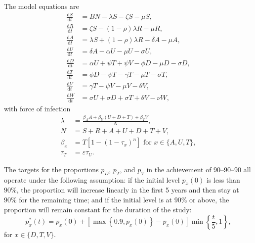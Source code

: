 \documentclass[11pt]{article}
\newcommand{\md}{\mathrm{d}}
\begin{document}
The model equations are
\begin{equation}
  \label{model_eqns}
  \begin{split}
    \frac{\md S}{\md t} &= B N - \lambda S - \zeta S- \mu S,
    \\
    \frac{\md R}{\md t} & = \zeta S - (1 - \rho) \lambda R - \mu R,
    \\
    \frac{\md A}{\md t} &= \lambda S + (1 - \rho) \lambda R - \delta A - \mu A,
    \\
    \frac{\md U}{\md t} &= \delta A - \alpha U - \mu U - \sigma U,
    \\
    \frac{\md D}{\md t} &=  \alpha U + \psi T + \psi V
    - \phi D - \mu D - \sigma D,
    \\
    \frac{\md T}{\md t} &= \phi D - \psi T - \gamma T - \mu T
    - \sigma T,
    \\
    \frac{\md V}{\md t} &= \gamma T - \psi V - \mu V - \theta V,
    \\
    \frac{\md W}{\md t} &= \sigma U + \sigma D + \sigma T + \theta V -
    \nu W,
  \end{split}
\end{equation}
with force of infection
\begin{equation}
  \label{force_of_infection}
  \begin{split}
    \lambda &= \frac{\beta_A A + \beta_U (U + D + T) + \beta_T V}{N},
    \\
    N &= S + R +  A + U + D + T + V,
    \\
    \beta_x &= T \left[1 - (1 - \tau_x)^n\right]
    \text{ for $x \in \{A, U, T\}$},
    \\
    \tau_T &= \varepsilon \tau_U.
  \end{split}
\end{equation}

The targets for the proportions $p_D$, $p_T$, and $p_V$ in the
achievement of 90--90--90 all operate under the following assumption:
if the initial level $p_x(0)$ is less than $90\%$, the proportion will
increase linearly in the first 5 years and then stay at $90\%$ for the
remaining time; and if the initial level is at $90\%$ or above, the
proportion will remain constant for the duration of the study:
\begin{equation}
  p_x^*(t)
  = p_x(0) + \left[
    \max\left\{0.9, p_x(0)\right\} - p_x(0)
  \right]
  \min\left\{\frac{t}{5}, 1\right\},
\end{equation}
for $x \in \{D, T, V\}$.
\end{document}
